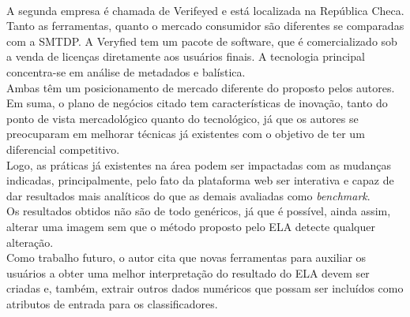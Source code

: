 \begin{enumerate}
\begin{enumerate}[label*=\arabic*.]
\\[6pt]
A segunda empresa é chamada de Verifeyed e está localizada na República Checa. Tanto as ferramentas, quanto o mercado consumidor são diferentes se comparadas com a SMTDP. A Veryfied tem um pacote de software, que é comercializado sob a venda de licenças diretamente aos usuários finais. A tecnologia principal concentra-se em análise de metadados e balística.
\\[6pt]
Ambas têm um posicionamento de mercado diferente do proposto pelos autores.
\\[6pt]
Em suma, o plano de negócios citado tem características de inovação, tanto do ponto de vista mercadológico quanto do tecnológico, já que os autores se preocuparam em melhorar técnicas já existentes com o objetivo de ter um diferencial competitivo.
\\[6pt]
Logo, as práticas já existentes na área podem ser impactadas com as mudanças indicadas, principalmente, pelo fato da plataforma web ser interativa e capaz de dar resultados mais analíticos do que as demais avaliadas como \textit{benchmark}.
\\[6pt]
Os resultados obtidos não são de todo genéricos, já que é possível, ainda assim, alterar uma imagem sem que o método proposto pelo ELA detecte qualquer alteração.
\\[6pt]
Como trabalho futuro, o autor cita que novas ferramentas para auxiliar os usuários a obter uma melhor interpretação do resultado do ELA devem ser criadas e, também, extrair outros dados numéricos que possam ser incluídos como atributos de entrada para os classificadores.
\end{enumerate}




\end{enumerate}
